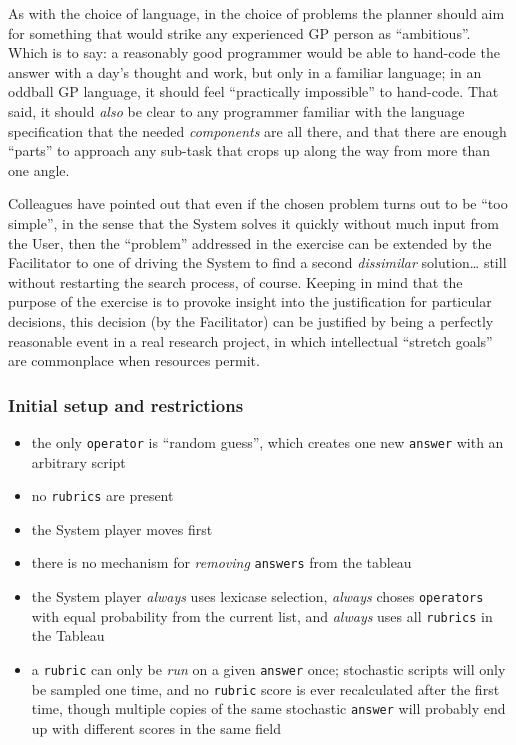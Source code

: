 As with the choice of language, in the choice of problems the planner should aim for something that would strike any experienced GP person as ``ambitious''. Which is to say: a reasonably good programmer would be able to hand-code the answer with a day's thought and work, but only in a familiar language; in an oddball GP language, it should feel ``practically impossible'' to hand-code. That said, it should \emph{also} be clear to any programmer familiar with the language specification that the needed \emph{components} are all there, and that there are enough ``parts'' to approach any sub-task that crops up along the way from more than one angle.

Colleagues have pointed out that even if the chosen problem turns out to be ``too simple'', in the sense that the System solves it quickly without much input from the User, then the ``problem'' addressed in the exercise can be extended by the Facilitator to one of driving the System to find a second \emph{dissimilar} solution\ldots{} still without restarting the search process, of course. Keeping in mind that the purpose of the exercise is to provoke insight into the justification for particular decisions, this decision (by the Facilitator) can be justified by being a perfectly reasonable event in a real research project, in which intellectual ``stretch goals'' are commonplace when resources permit.

\subsubsection{Initial setup and restrictions}\hypertarget{initial-setup-and-restrictions}{}\label{initial-setup-and-restrictions}

\begin{itemize}
\item the only \texttt{operator} is ``random guess'', which creates one new \texttt{answer} with an arbitrary script
\item no \texttt{rubrics} are present
\item the System player moves first
\item there is no mechanism for \emph{removing} \texttt{answers} from the tableau
\item the System player \emph{always} uses lexicase selection, \emph{always} choses \texttt{operators} with equal probability from the current list, and \emph{always} uses all \texttt{rubrics} in the Tableau
\item a \texttt{rubric} can only be \emph{run} on a given \texttt{answer} once; stochastic scripts will only be sampled one time, and no \texttt{rubric} score is ever recalculated after the first time, though multiple copies of the same stochastic \texttt{answer} will probably end up with different scores in the same field
\end{itemize}

